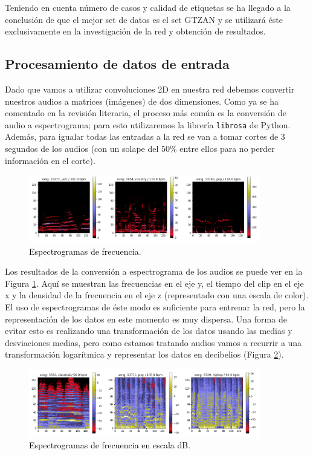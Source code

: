 Teniendo en cuenta número de casos y calidad de etiquetas se ha llegado a la conclusión de que el mejor set de datos es el set GTZAN y se utilizará éste exclusivamente en la investigación de la red y obtención de resultados.

\subsection{Procesamiento de datos de entrada}\label{sec:pre_process}
\noindent Dado que vamos a utilizar convoluciones 2D en nuestra red debemos convertir nuestros audios a matrices (imágenes) de dos dimensiones. Como ya se ha comentado en la revisión literaria, el proceso más común es la conversión de audio a espectrograma; para esto utilizaremos la librería \texttt{librosa} de Python. Además, para igualar todas las entradas a la red se van a tomar cortes de 3 segundos de los audios (con un solape del $50\%$ entre ellos para no perder información en el corte). 

\begin{figure}[htb]
  \centering
  \includegraphics[width=0.9\textwidth]{Figures/espectrogramas2.png}
  \caption{\textcolor{black}{Espectrogramas de frecuencia}.}
  \label{Fig:espectrogramas}
\end{figure}

Los resultados de la conversión a espectrograma de los audios se puede ver en la Figura \ref{Fig:espectrogramas}. Aquí se muestran las frecuencias en el eje y, el tiempo del clip en el eje x y la densidad de la frecuencia en el eje z (representado con una escala de color). El uso de espectrogramas de éste modo es suficiente para entrenar la red, pero la representación de los datos en este momento es muy dispersa. Una forma de evitar esto es realizando una transformación de los datos usando las medias y desviaciones medias, pero como estamos tratando audios vamos a recurrir a una transformación logarítmica y representar los datos en decibelios (Figura \ref{Fig:espectrogramas_db}). 

\begin{figure}[htb]
  \centering
  \includegraphics[width=0.9\textwidth]{Figures/espectrogramas_db2.png}
  \caption{\textcolor{black}{Espectrogramas de frecuencia en escala dB}.}
  \label{Fig:espectrogramas_db}
\end{figure}

